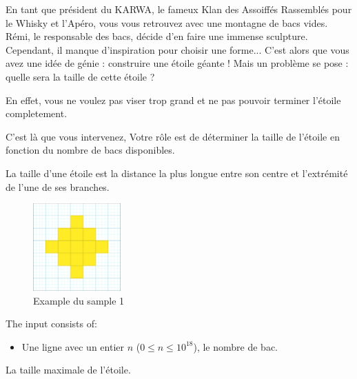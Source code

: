 \problemname{}


\newcommand{\maxn}{10^18}

En tant que président du KARWA, le fameux Klan des Assoiffés Rassemblés pour le Whisky et l'Apéro, vous vous retrouvez avec une montagne de bacs vides. Rémi, le responsable des bacs, décide d'en faire une immense sculpture. Cependant, il manque d'inspiration pour choisir une forme... 
C'est alors que vous avez une idée de génie : construire une étoile géante ! Mais un problème se pose : quelle sera la taille de cette étoile ?

En effet, vous ne voulez pas viser trop grand et ne pas pouvoir terminer l'étoile completement.

C'est là que vous intervenez, Votre rôle est de déterminer la taille de l'étoile en fonction du nombre de bacs disponibles.

La taille d'une étoile est la distance la plus longue entre son centre et l'extrémité de l'une de ses branches.

\smallskip
\begin{figure}[h]
    \centering
    \includegraphics[width=0.3\textwidth]{example.png}
    \caption{Example du sample 1}
\end{figure}


\begin{Input}
    The input consists of:
    \begin{itemize}
        \item Une ligne avec un entier $n$ ($0\leq n\leq \maxn$), le nombre de bac.
    \end{itemize}
\end{Input}

\begin{Output}
    La taille maximale de l'étoile.
\end{Output}
